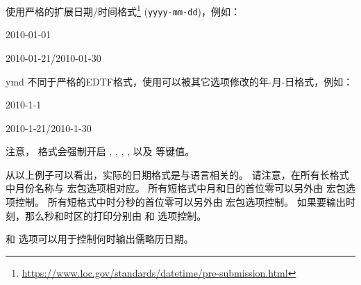 \begin{optionlist}
\begin{valuelist}
使用严格的扩展日期/时间格式\footnote{%
	\url{https://www.loc.gov/standards/datetime/pre-submission.html}}
(\texttt{yyyy-mm-dd})，例如：\par
2010-01-01\par
2010-01-21/2010-01-30
\item[ymd] %
不同于严格的EDTF格式，使用可以被其它选项修改的年-月-日格式，例如：\par
2010-1-1\par
2010-1-21/2010-1-30
\end{valuelist}
%
注意， 格式会强制开启 , , , ,  以及  等键值。


从以上例子可以看出，实际的日期格式是与语言相关的。
请注意，在所有长格式中月份名称与  宏包选项相对应。
所有短格式中月和日的首位零可以另外由  宏包选项控制。
所有短格式中时分秒的首位零可以另外由  宏包选项控制。
如果要输出时刻，那么秒和时区的打印分别由  和  选项控制。


 和  选项可以用于控制何时输出儒略历日期。



\end{optionlist}
